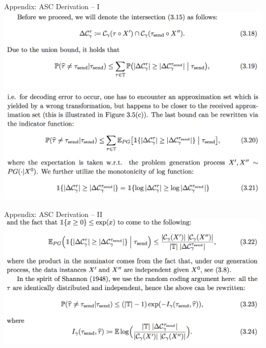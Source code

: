 \documentclass[presentation,12pt]{beamer}
\begin{document}
\begin{frame}{Appendix: ASC Derivation -- I}
  \centering
  \includegraphics[width=\textwidth]{asc_derivation_1.png}\\
  \includegraphics[width=\textwidth]{asc_derivation_2.png}
\end{frame}

\begin{frame}{Appendix: ASC Derivation -- II}
  \centering
  \includegraphics[width=\textwidth]{asc_derivation_3.png}
\end{frame}
\end{document}
